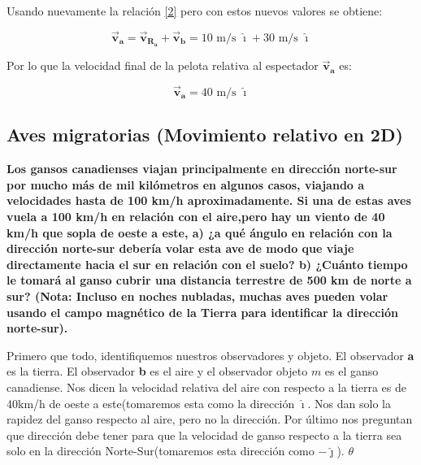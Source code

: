 \documentclass[a4paper,11pt]{article}
\begin{document}
	Usando nuevamente la relación \ref{2} pero con estos nuevos valores se obtiene:
	
	
	
	\begin{equation}
	\vec{\textbf{v}}_{\textbf{a}} = \vec{\textbf{v}}_{\textbf{R}_\textbf{a}} + \vec{\textbf{v}}_{\textbf{b}} = 10 \text{ m/s } \boldsymbol{\hat{\imath}} + 30 \text{ m/s } \boldsymbol{\hat{\imath}}
	\end{equation}
	
	Por lo que la velocidad final de la pelota relativa al espectador $\vec{\textbf{v}}_{\textbf{a}}$ es:
	
	\begin{equation}
	\vec{\textbf{v}}_{\textbf{a}} =  40 \text{ m/s } \boldsymbol{\hat{\imath}} 
	\end{equation}
	
	\color{pb}
	\subsection{Aves migratorias (Movimiento relativo en 2D)}
	
	\textbf{Los gansos canadienses viajan principalmente en dirección norte-sur por mucho más de mil kilómetros en
		algunos casos, viajando a velocidades hasta de 100 km/h aproximadamente. Si una de estas aves vuela a 100 km/h en relación con el aire,pero hay un viento de 40 km/h que sopla de oeste a este, a) ¿a qué
		ángulo en relación con la dirección norte-sur debería volar esta ave
		de modo que viaje directamente hacia el sur en relación con el suelo?
		b) ¿Cuánto tiempo le tomará al ganso cubrir una distancia terrestre de
		500 km de norte a sur? (Nota: Incluso en noches nubladas, muchas
		aves pueden volar usando el campo magnético de la Tierra para identificar la dirección norte-sur).\\}
	\color{black}
	
	Primero que todo, identifiquemos nuestros observadores y objeto. El observador \textbf{a} es la tierra. El observador \textbf{b} es el aire y el observador objeto $m$ es el ganso canadiense. Nos dicen la velocidad relativa del aire con respecto a la tierra es de 40km/h de oeste a este(tomaremos esta como la dirección $\boldsymbol{\hat{\imath}}$. Nos dan solo la rapidez del ganso respecto al aire, pero no la dirección. Por último nos preguntan que dirección debe tener para que la velocidad de ganso respecto a la tierra sea solo en la dirección Norte-Sur(tomaremos esta dirección como $-\boldsymbol{\hat{\jmath}}$).  $\theta$ 
	
\end{document}
